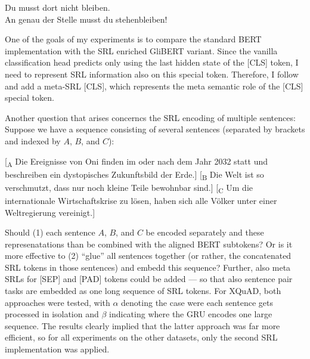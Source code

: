 \begin{examples}
  \item Du musst dort nicht bleiben.\\
        An genau der Stelle musst du stehenbleiben!

                                    
\end{examples}

One of the goals of my experiments is to compare the standard BERT implementation with the SRL
enriched GliBERT variant. Since the vanilla classification head predicts only using the last
hidden state of the [CLS] token, I need to represent SRL information also on this special
token. Therefore, I follow \cite{zhang2019semantics} and add a meta-SRL [CLS], which represents
the meta semantic role of the [CLS] special token.

Another question that arises concerncs the SRL encoding of multiple sentences:
Suppose we have a sequence consisting of several sentences (separated by brackets and indexed by $A$, $B$, and $C$):

\begin{examples}
  \item {[}\textsubscript{A} Die Ereignisse von Oni finden im oder nach dem Jahr 2032 statt und beschreiben ein dystopisches Zukunftsbild der Erde.] [\textsubscript{B} Die Welt ist so verschmutzt, dass nur noch kleine Teile bewohnbar sind.] [\textsubscript{C} Um die internationale Wirtschaftskrise zu lösen, haben sich alle Völker unter einer Weltregierung vereinigt.]
\end{examples}

Should (1) each sentence $A$, $B$, and $C$ be encoded separately and these represenatations
than be combined with the aligned BERT subtokens? Or is it more effective to (2) ``glue'' all
sentences together (or rather, the concatenated SRL tokens in those sentences) and embedd this
sequence? Further, also meta SRLs for [SEP] and [PAD] tokens could be added --- so that also
sentence pair tasks are embedded as one long sequence of SRL tokens. For XQuAD, both approaches
were tested, with $\alpha$ denoting the case were each sentence gets processed in isolation and
$\beta$ indicating where the GRU encodes one large sequence. The results clearly implied
that the latter approach was far more efficient, so for all experiments on the other datasets,
only the second SRL implementation was applied.



